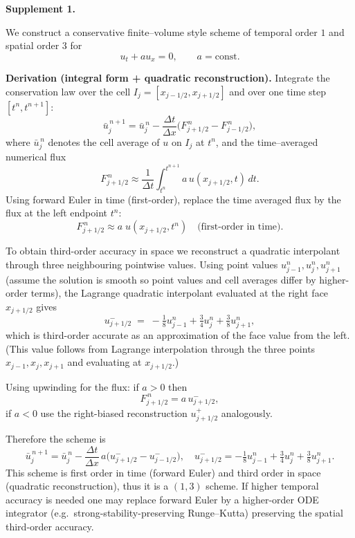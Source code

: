 \documentclass[11pt]{article}
\begin{document}
\vspace{1em}

\noindent\textbf{Supplement 1.}

We construct a conservative finite–volume style scheme of temporal order \(1\) and spatial order \(3\) for
\[
u_t + a u_x = 0,\qquad a=\text{const}.
\]

\medskip

\textbf{Derivation (integral form + quadratic reconstruction).}
Integrate the conservation law over the cell \(I_j=[x_{j-1/2},x_{j+1/2}]\) and over one time step \([t^n,t^{n+1}]\):
\[
\bar u_j^{\,n+1} = \bar u_j^{\,n} - \frac{\Delta t}{\Delta x}\Big( F_{j+1/2}^{\,n} - F_{j-1/2}^{\,n}\Big),
\]
where \(\bar u_j^{\,n}\) denotes the cell average of \(u\) on \(I_j\) at \(t^n\), and the time–averaged numerical flux
\[
F_{j+1/2}^{\,n} \approx \frac{1}{\Delta t}\int_{t^n}^{t^{n+1}} a\,u(x_{j+1/2},t)\,dt.
\]
Using forward Euler in time (first-order), replace the time averaged flux by the flux at the left endpoint \(t^n\):
\[
F_{j+1/2}^{\,n} \approx a\; u(x_{j+1/2},t^n) \quad\text{(first-order in time).}
\]

To obtain third-order accuracy in space we reconstruct a quadratic interpolant through three neighbouring pointwise values. Using point values \(u_{j-1}^n, u_j^n, u_{j+1}^n\) (assume the solution is smooth so point values and cell averages differ by higher-order terms), the Lagrange quadratic interpolant evaluated at the right face \(x_{j+1/2}\) gives
\[
u_{j+1/2}^- \;=\; -\tfrac{1}{8}u_{j-1}^n + \tfrac{3}{4}u_j^n + \tfrac{3}{8}u_{j+1}^n,
\]
which is third-order accurate as an approximation of the face value from the left. (This value follows from Lagrange interpolation through the three points \(x_{j-1},x_j,x_{j+1}\) and evaluating at \(x_{j+1/2}\).)

Using upwinding for the flux: if \(a>0\) then
\[
F_{j+1/2}^{\,n} = a\,u_{j+1/2}^-,
\]
if \(a<0\) use the right-biased reconstruction \(u_{j+1/2}^+\) analogously.

Therefore the scheme is
\[
\boxed{ \quad
\bar u_j^{\,n+1} = \bar u_j^{\,n} - \frac{\Delta t}{\Delta x}\,a\Big(u_{j+1/2}^- - u_{j-1/2}^-\Big),
\quad u_{j+1/2}^- = -\tfrac{1}{8}u_{j-1}^n + \tfrac{3}{4}u_j^n + \tfrac{3}{8}u_{j+1}^n. \quad }
\]
This scheme is first order in time (forward Euler) and third order in space (quadratic reconstruction), thus it is a \((1,3)\) scheme. If higher temporal accuracy is needed one may replace forward Euler by a higher-order ODE integrator (e.g.\ strong-stability-preserving Runge--Kutta) preserving the spatial third-order accuracy.
\end{document}
